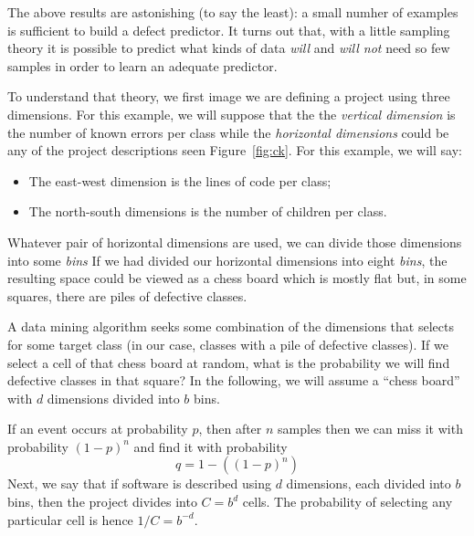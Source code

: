 



\newcommand{\fig}[1]{Figure~\ref{fig:#1}}
\newcommand{\eq}[1]{Equation~\ref{eq:#1}}
\newcommand{\bi}{\begin{itemize}}
\newcommand{\ei}{\end{itemize}}

The above results are astonishing (to say the least): a small numher
of examples is sufficient to build a defect predictor. It turns out that, with a little sampling theory
it is possible to predict what kinds of data {\em will} and {\em will not} need so few samples in order to learn an adequate predictor.

To understand that theory, we first image we are defining a  project using three dimensions.
For this example, we will suppose that the
the {\em vertical dimension} is the number of known errors per class while
the {\em horizontal dimensions} could be any of the project descriptions seen \fig{ck}. For this example, we will say:
  \bi
  \item The east-west dimension is the lines of code per class;
  \item The north-south dimensions is the number of children per class.
    \ei
    Whatever pair of horizontal dimensions are used, we can divide those dimensions into some {\em bins}
    If we had  divided our horizontal dimensions into eight {\em bins}, the resulting space
    could be viewed as a chess board which is mostly flat but, in some squares, there
    are piles of defective classes.

    A data mining algorithm seeks some combination of the dimensions that selects for some target class (in our case,
    classes with a pile of defective classes). If we select a cell of that chess board at random, what is the probability
    we will find defective classes in that square? In the following, we will assume a ``chess board'' with $d$ dimensions
    divided into $b$ bins.

    If an event occurs at probability $p$,
    then after $n$ samples then 
    we can miss it with probability $(1-p)^n$ and find it with probability
    \begin{equation}\label{eq:pb}
      q=1-((1-p)^n)
    \end{equation}
    Next, we say that if software is described using   $d$ dimensions, each divided into $b$ bins, then the 
    project divides into   $C=b^d$ cells.
    The probability of selecting any particular cell is hence $1/C = b^{-d}$.
    
